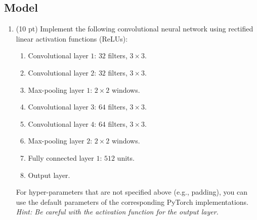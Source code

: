 \documentclass[a4paper,11pt]{article}
\begin{document}
\subsection{Model}
\begin{enumerate}
 \item (10 pt) Implement the following convolutional neural network using rectified linear activation functions (ReLUs):
 \begin{enumerate}
    \item Convolutional layer $1$: $32$ filters, $3 \times 3$.
    \item Convolutional layer $2$: $32$ filters, $3 \times 3$.
    \item Max-pooling layer $1$: $2 \times 2$ windows.
    \item Convolutional layer $3$: $64$ filters, $3 \times 3$.
    \item Convolutional layer $4$: $64$ filters, $3 \times 3$.
    \item Max-pooling layer $2$: $2 \times 2$ windows.
    \item Fully connected layer $1$: $512$ units.
    \item Output layer.
 \end{enumerate}
For hyper-parameters that are not specified above (e.g., padding), you can use the default
parameters of the corresponding PyTorch implementations.
\textit{Hint: Be careful with the activation function for the output layer.}
\end{enumerate}
\end{document}
